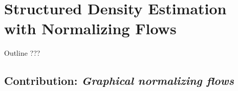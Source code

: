 \chapter{Structured Density Estimation with Normalizing Flows}\label{ch:06}

\begin{remark}{Outline}
???
\end{remark}

\section{Contribution: \textit{Graphical normalizing flows}}
